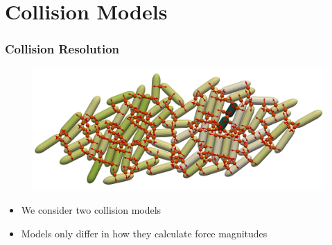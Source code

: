 \documentclass[10pt,t]{beamer}
\begin{document}

\section{Collision Models}


\begin{frame}
    \frametitle{Collision Resolution}

    \begin{figure}
        \centering
        \includegraphics[width=1\textwidth]{figures/constraints.jpeg}
    \end{figure}


    \begin{itemize}
        \item We consider two collision models
        \item Models only differ in how they calculate force magnitudes
    \end{itemize}

\end{frame}
\end{document}
